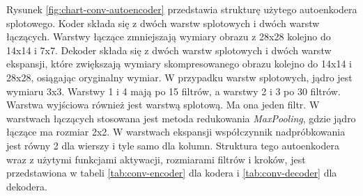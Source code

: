 \documentclass[12pt]{mwbk}
\theoremstyle{plain}
\theoremstyle{definition}
\theoremstyle{remark}
\newcommand\zrodlo[1]{\par\vspace{-3mm}{\small\textit{Źródło: }#1 }}
\begin{document}
Rysunek \ref{fig:chart-conv-autoencoder} przedstawia strukturę użytego autoenkodera splotowego. Koder składa się z dwóch warstw splotowych i dwóch warstw łączących. Warstwy łączące zmniejszają wymiary obrazu z 28x28 kolejno do 14x14 i 7x7. Dekoder składa się z dwóch warstw splotowych i dwóch warstw ekspansji, które zwiększają wymiary skompresowanego obrazu kolejno do 14x14 i 28x28, osiągając oryginalny wymiar. W przypadku warstw splotowych, jądro jest wymiaru 3x3. Warstwy 1 i 4 mają po 15 filtrów, a warstwy 2 i 3 po 30 filtrów. Warstwa wyjściowa również jest warstwą splotową. Ma ona jeden filtr. W warstwach łączących stosowana jest metoda redukowania \emph{MaxPooling}, gdzie jądro łączące ma rozmiar 2x2. W warstwach ekspansji współczynnik nadpróbkowania  jest równy 2 dla wierszy i tyle samo dla kolumn. Struktura tego autoenkodera wraz z użytymi funkcjami aktywacji, rozmiarami filtrów i kroków, jest przedstawiona w tabeli \ref{tab:conv-encoder} dla kodera i \ref{tab:conv-decoder} dla dekodera.

\end{document}
